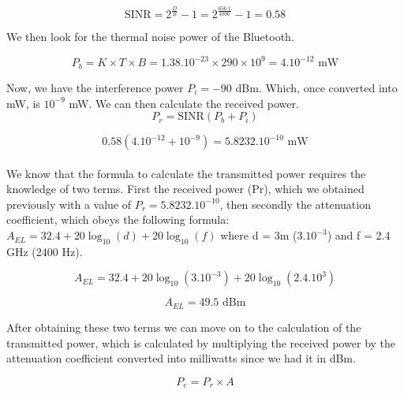 \documentclass[12]{article}
\begin{document}
\begin{equation*}
    \text{SINR} = 2^{\frac{D}{B}} - 1 =  2^{\frac{656.1}{1000}} - 1 = 0.58
\end{equation*}

We then look for the thermal noise power of the Bluetooth.

\begin{equation*}
    P_b = K \times T \times B = 1.38.10^{-23} \times 290 \times 10^9 = 4.10^{-12} \text{ mW}
\end{equation*}

Now, we have the interference power $P_i = -90$ dBm. Which, once converted into mW, is $10^{-9}$ mW. We can then calculate the received power.\\

\begin{equation*}
    P_r = \text{SINR} \left( P_b + P_i \right)
\end{equation*}

\begin{equation*}
    0.58 \left( 4.10^{-12} + 10^{-9} \right) = 5.8232.10^{-10} \text{ mW}
\end{equation*}
\\

We know that the formula to calculate the transmitted power requires the knowledge of two terms. First the received power (Pr), which we obtained previously with a value of $P_r = 5.8232.10^{-10}$, then secondly the attenuation coefficient, which obeys the following formula: $A_{EL} = 32.4 + 20 \log_{10} \left( d \right) + 20 \log_{10} \left( f \right) $ where d = 3m ($3.10^{-3}$) and f = 2.4 GHz (2400 Hz).

\begin{equation*}
    A_{EL} = 32.4 + 20 \log_{10} \left( 3.10^{-3} \right) + 20 \log_{10} \left( 2.4.10^{3} \right)
\end{equation*}

\begin{equation*}
    A_{EL} = 49.5 \text{ dBm}
\end{equation*}

After obtaining these two terms we can move on to the calculation of the transmitted power, which is calculated by multiplying the received power by the attenuation coefficient converted into milliwatts since we had it in dBm.

\begin{equation*}
    P_{e} = P_{r} \times A
\end{equation*}
\end{document}
